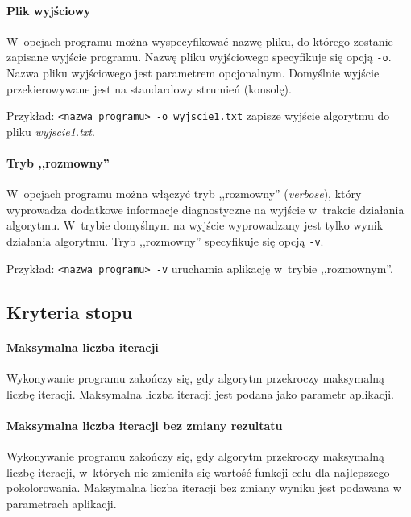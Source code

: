 \paragraph{Plik wyjściowy}

W~opcjach programu można wyspecyfikować nazwę pliku, do którego zostanie zapisane wyjście programu. Nazwę pliku wyjściowego specyfikuje się opcją \verb+-o+. Nazwa pliku wyjściowego jest parametrem opcjonalnym. Domyślnie wyjście przekierowywane jest na standardowy strumień (konsolę).

Przykład: \verb+<nazwa_programu> -o wyjscie1.txt+ zapisze wyjście algorytmu do pliku \emph{wyjscie1.txt}.

\paragraph{Tryb ,,rozmowny''}

W~opcjach programu można włączyć tryb ,,rozmowny'' (\emph{verbose}), który wyprowadza dodatkowe informacje diagnostyczne na wyjście w~trakcie działania algorytmu. W~trybie domyślnym na wyjście wyprowadzany jest tylko wynik działania algorytmu. Tryb ,,rozmowny'' specyfikuje się opcją \verb+-v+.

Przykład: \verb+<nazwa_programu> -v+ uruchamia aplikację w~trybie ,,rozmownym''.

\subsection{Kryteria stopu}
\label{sec:stop_criteria}

\paragraph{Maksymalna liczba iteracji}

Wykonywanie programu zakończy się, gdy algorytm przekroczy maksymalną liczbę iteracji. Maksymalna liczba iteracji jest podana jako parametr aplikacji.

\paragraph{Maksymalna liczba iteracji bez zmiany rezultatu}

Wykonywanie programu zakończy się, gdy algorytm przekroczy maksymalną liczbę iteracji, w~których nie zmieniła się wartość funkcji celu dla najlepszego pokolorowania. Maksymalna liczba iteracji bez zmiany wyniku jest podawana w parametrach aplikacji.

